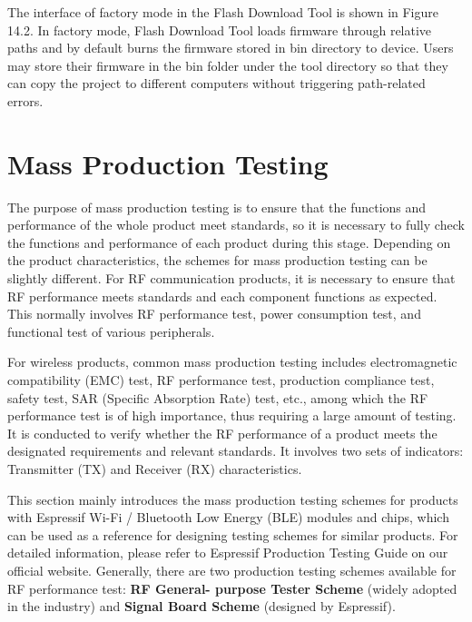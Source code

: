\documentclass[a4paper,12pt,openany]{book}
\begin{document}
The interface of factory mode in the Flash Download Tool is shown in Figure 14.2. In factory mode, Flash Download Tool loads firmware through relative paths and by default burns the firmware stored in bin directory to device. Users may store their firmware in the bin folder under the tool directory so that they can copy the project to different computers without triggering path-related errors.

\section{Mass Production Testing}

The purpose of mass production testing is to ensure that the functions and performance of the whole product meet standards, so it is necessary to fully check the functions and performance of each product during this stage. Depending on the product characteristics, the schemes for mass production testing can be slightly different. For RF communication products, it is necessary to ensure that RF performance meets standards and each component functions as expected. This normally involves RF performance test, power consumption test, and functional test of various peripherals.

For wireless products, common mass production testing includes electromagnetic compatibility (EMC) test, RF performance test, production compliance test, safety test, SAR (Specific Absorption Rate) test, etc., among which the RF performance test is of high importance, thus requiring a large amount of testing. It is conducted to verify whether the RF performance of a product meets the designated requirements and relevant standards. It involves two sets of indicators: Transmitter (TX) and Receiver (RX) characteristics.

This section mainly introduces the mass production testing schemes for products with Espressif Wi-Fi / Bluetooth Low Energy (BLE) modules and chips, which can be used as a reference for designing testing schemes for similar products. For detailed information, please refer to Espressif Production Testing Guide on our official website. Generally, there are two production testing schemes available for RF performance test: \textbf{RF General- purpose Tester Scheme} (widely adopted in the industry) and \textbf{Signal Board Scheme} (designed by Espressif).
\end{document}
